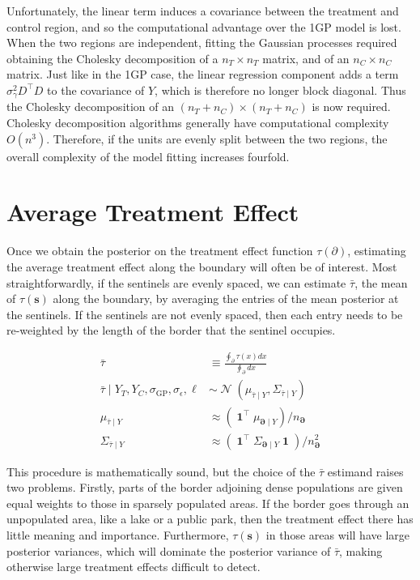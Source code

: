 \documentclass[letter]{article}
\newcommand{\genericdel}[3]{%
      \left#1#3\right#2
    }
\newcommand{\del}[1]{\genericdel(){#1}}
\DeclareMathOperator{\normal}{\mathcal{N}}
\DeclareMathOperator{\ones}{\mathbf{1}}
\newcommand{\trans}{^{\intercal}}
\newcommand{\sigmaf}{\sigma_{\mathrm{GP}}}
\newcommand{\sigman}{\sigma_{\epsilon}}
\newcommand{\sigmagamma}{\sigma_{\gamma}}
\newcommand{\svec}{\mathbold{s}}
\newcommand{\boundary}{\partial}
\newcommand{\sentinels}{\bm{\boundary}}
\newcommand{\linavg}{\bar{\tau}}
\begin{document}
Unfortunately, the linear term induces a covariance between the treatment and control region, and so the computational advantage over the 1GP model is lost.
When the two regions are independent, fitting the Gaussian processes required obtaining the Cholesky decomposition of a \(n_T \times n_T\) matrix, and of an \(n_C \times n_C\) matrix.
Just like in the 1GP case, the linear regression component adds a term \(\sigmagamma^2 D\trans D\) to the covariance of \(Y\), which is therefore no longer block diagonal.
Thus the Cholesky decomposition of an \((n_T+n_C) \times (n_T+n_C)\) is now required.
Cholesky decomposition algorithms generally have computational complexity \(O(n^3)\).
Therefore, if the units are evenly split between the two regions,
the overall complexity of the model fitting increases fourfold.
    


    	\section{Average Treatment Effect}\label{average-treatment-effect}

Once we obtain the posterior on the treatment effect function \(\tau(\boundary)\), estimating the average treatment effect along the boundary will often be of interest. Most straightforwardly, if the sentinels are evenly spaced, we can estimate \(\linavg\), the mean of \(\tau(\svec)\) along the boundary, by averaging the entries of the mean posterior at the sentinels. If the sentinels are not evenly spaced, then each entry needs to be re-weighted by the length of the border that the sentinel occupies.

\begin{equation}\begin{split}
    \linavg &\equiv \frac{\oint_\boundary \left. \tau(x) dx \right.}{\oint_\boundary \left. dx \right.} \\
    \linavg \mid Y_T, Y_C, \sigmaf, \sigman, \ell &\sim \normal\del{\mu_{\linavg \mid Y}, \Sigma_{\linavg \mid Y}} \\
    \mu_{\linavg \mid Y} &\approx \del{\ones\trans \mu_{\sentinels \mid Y}} / n_{\sentinels} \\
    \Sigma_{\linavg \mid Y} &\approx \del{\ones\trans \Sigma_{\sentinels \mid Y} \ones} / n_{\sentinels}^2
\end{split}\end{equation}

This procedure is mathematically sound, but the choice of the \(\linavg\) estimand raises two problems. Firstly, parts of the border adjoining dense populations are given equal weights to those in sparsely populated areas. If the border goes through an unpopulated area, like a lake or a public park, then the treatment effect there has little meaning and importance. Furthermore, \(\tau(\svec)\) in those areas will have large posterior variances, which will dominate the posterior variance of \(\linavg\), making otherwise large treatment effects difficult to detect.
\end{document}
